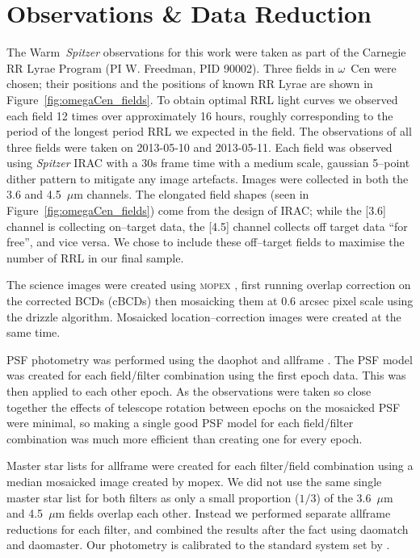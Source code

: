 \documentclass[a4paper,fleqn,usenatbib]{mnras}
\begin{document}
\section{Observations \& Data Reduction}
\label{sec:observations}
The Warm~\textit{Spitzer} observations for this work were taken as part of the Carnegie RR Lyrae Program (PI W. Freedman, PID 90002). Three fields in $\omega$~Cen were chosen; their positions and the positions of known RR Lyrae are shown in Figure~\ref{fig:omegaCen_fields}. To obtain optimal RRL light curves we observed each field 12 times over approximately 16 hours, roughly corresponding to the period of the longest period RRL we expected in the field. The observations of all three fields were taken on 2013-05-10 and 2013-05-11. Each field was observed using {\it Spitzer} IRAC \citep{2004ApJS..154...10F} with a 30s frame time with a medium scale, gaussian 5--point dither pattern to mitigate any image artefacts. Images were collected in both the 3.6 and 4.5~$\mu$m channels. 
The elongated field shapes (seen in Figure~\ref{fig:omegaCen_fields}) come from the design of IRAC; while the [3.6] channel is collecting on--target data, the [4.5] channel collects off target data ``for free'', and vice versa. We chose to include these off--target fields to maximise the number of RRL in our final sample. 

The science images were created using \textsc{mopex} \citep{2006SPIE.6274E..0CM}, first running overlap correction on the corrected BCDs (cBCDs) then mosaicking them at 0.6 arcsec pixel scale using the drizzle algorithm. Mosaicked location--correction images were created at the same time. 

PSF photometry was performed using the {\sc daophot} and {\sc allframe} \citep{1987PASP...99..191S, 1994PASP..106..250S}. The PSF model was created for each field/filter combination using the first epoch data. This was then applied to each other epoch. As the observations were taken so close together the effects of telescope rotation between epochs on the mosaicked PSF were minimal, so making a single good PSF model for each field/filter combination was much more efficient than creating one for every epoch. 

Master star lists for {\sc allframe} were created for each filter/field combination using a median mosaicked image created by {\sc mopex}. We did not use the same single master star list for both filters as only a small proportion ($1/3$) of the 3.6~$\mu$m and 4.5~$\mu$m fields overlap each other. Instead we performed separate {\sc allframe} reductions for each filter, and combined the results after the fact using {\sc daomatch} and {\sc daomaster}. Our photometry is calibrated to the standard system set by \citet{2005PASP..117..978R}.
\end{document}
